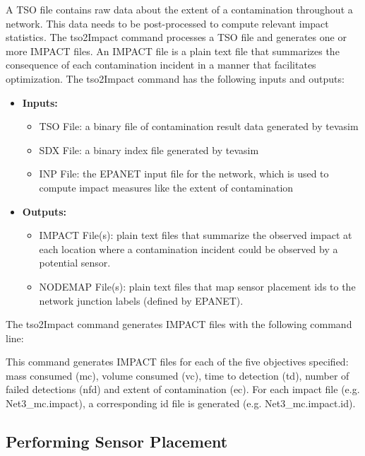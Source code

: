 A TSO file contains raw data about the extent of a contamination throughout a network. This data needs to be post-\/processed to compute relevant impact statistics. The {\ttfamily tso2Impact} command processes a TSO file and generates one or more IMPACT files. An {\ttfamily IMPACT} file is a plain text file that summarizes the consequence of each contamination incident in a manner that facilitates optimization. The {\ttfamily tso2Impact} command has the following inputs and outputs: 
\begin{itemize}
\item {\bfseries Inputs:} 
\begin{itemize}
\item TSO File: a binary file of contamination result data generated by {\ttfamily tevasim} 
\item SDX File: a binary index file generated by {\ttfamily tevasim} 
\item INP File: the EPANET input file for the network, which is used to compute impact measures like the extent of contamination 
\end{itemize}
\item {\bfseries Outputs:} 
\begin{itemize}
\item IMPACT File(s): plain text files that summarize the observed impact at each location where a contamination incident could be observed by a potential sensor. 
\item NODEMAP File(s): plain text files that map sensor placement ids to the network junction labels (defined by EPANET). 
\end{itemize}
\end{itemize}The {\ttfamily tso2Impact} command generates IMPACT files with the following command line: 

 This command generates IMPACT files for each of the five objectives specified: mass consumed (mc), volume consumed (vc), time to detection (td), number of failed detections (nfd) and extent of contamination (ec). For each impact file (e.g. {\ttfamily Net3\_\-mc.impact}), a corresponding id file is generated (e.g. {\ttfamily Net3\_\-mc.impact.id}).

\subsection{Performing Sensor Placement}\label{example_gStartedSP}

